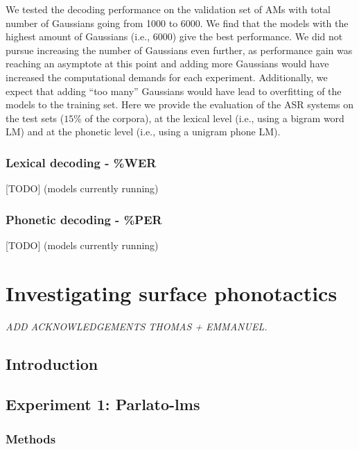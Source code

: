 We tested the decoding performance on the validation set of AMs with total number of Gaussians going from 1000 to 6000. We find that the models with the highest amount of Gaussians (i.e., 6000) give the best performance. We did not pursue increasing the number of Gaussians even further, as performance gain was reaching an asymptote at this point and adding more Gaussians would have increased the computational demands for each experiment. Additionally, we expect that adding ``too many'' Gaussians would have lead to overfitting of the models to the training set. Here we provide the evaluation of the ASR systems on the test sets ($15\%$ of the corpora), at the lexical level (i.e., using a bigram word LM) and at the phonetic level (i.e., using a unigram phone LM).  

\subsubsection{Lexical decoding - \%WER}
{\color{red}[TODO] (models currently running)}

\subsubsection{Phonetic decoding - \%PER}
{\color{red}[TODO] (models currently running)}


\newpage
\section{{\color{red}Investigating surface phonotactics}} \label{3-surfphono}

\small{\textit{{\color{red}ADD ACKNOWLEDGEMENTS THOMAS + EMMANUEL.\\}}}

\subsection{Introduction}
\subsection{Experiment 1: {\color{red}Parlato-lms}}
\subsubsection{Methods}
